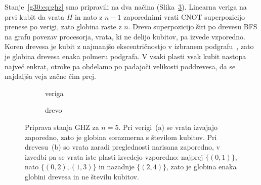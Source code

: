 Stanje~\eqref{g30:eq:ghz} smo pripravili na dva načina (Slika~\ref{g30:fig:vezji}). Linearna veriga na prvi kubit da vrata $H$ in nato z $n-1$ zaporednimi vrati CNOT superpozicijo prenese po verigi, zato globina raste z $n$. Drevo superpozicijo širi po drevesu BFS na grafu povezav procesorja, vrata, ki ne delijo kubitov, pa izvede vzporedno. Koren drevesa je kubit z najmanjšo ekscentričnostjo v izbranem podgrafu~\cite{g30:bigcats2025}, zato je globina drevesa enaka polmeru podgrafa. V vsaki plasti vsak kubit nastopa največ enkrat, otroke pa obdelamo po padajoči velikosti poddrevesa, da se najdaljša veja začne čim prej.

\begin{figure}[htbp]
\centering
\begin{subfigure}[b]{0.48\textwidth}
\centering
{}
\caption{veriga}
\label{g30:fig:veriga}
\end{subfigure}
\hfill
\begin{subfigure}[b]{0.48\textwidth}
\centering
{}
\caption{drevo}
\label{g30:fig:drevo}
\end{subfigure}
\caption{Priprava stanja GHZ za $n = 5$. Pri verigi~(a) se vrata izvajajo zaporedno, zato je globina sorazmerna s številom kubitov. Pri drevesu~(b) so vrata zaradi preglednosti narisana zaporedno, v izvedbi pa se vrata iste plasti izvedejo vzporedno: najprej $\{(0,1)\}$, nato $\{(0,2), (1,3)\}$ in nazadnje $\{(2,4)\}$, zato je globina enaka globini drevesa in ne številu kubitov.}
\label{g30:fig:vezji}
\end{figure}

